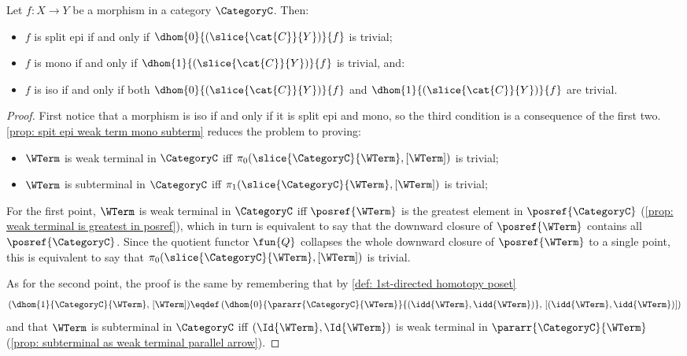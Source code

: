     \begingroup
    \def\thecorollary{\ref{cor: spit epi iff dhom0 trivial mono iff dhom1 trivial}}
    \begin{corollary}
        Let $f\colon X \to Y$ be a morphism in a category $\CategoryC$. Then:
        \begin{itemize}
            \item $f$ is split epi if and only if $\dhom{0}{(\slice{\cat{C}}{Y})}{f}$ is trivial;
            \item $f$ is mono if and only if $\dhom{1}{(\slice{\cat{C}}{Y})}{f}$ is trivial, and:
            \item $f$ is iso if and only if both $\dhom{0}{(\slice{\cat{C}}{Y})}{f}$ and $\dhom{1}{(\slice{\cat{C}}{Y})}{f}$ are trivial.
        \end{itemize}
    \end{corollary}
    \addtocounter{corollary}{-1}
    \endgroup
    \begin{proof}
        First notice that a morphism is iso if and only if it is split epi and mono, so the third condition is a consequence of the first two. \autoref{prop: spit epi weak term mono subterm} reduces the problem to proving:
        \begin{itemize}
            \item $\WTerm$ is weak terminal in $\CategoryC$ iff $\pi_0(\slice{\CategoryC}{\WTerm}, [\WTerm])$ is trivial;
            \item $\WTerm$ is subterminal in $\CategoryC$ iff $\pi_1(\slice{\CategoryC}{\WTerm}, [\WTerm])$ is trivial;
        \end{itemize}
        For the first point, $\WTerm$ is weak terminal in $\CategoryC$ iff $\posref{\WTerm}$ is the greatest element in $\posref{\CategoryC}$ (\autoref{prop: weak terminal is greatest in posref}), which in turn is equivalent to say that the downward closure of $\posref{\WTerm}$ contains all $\posref{\CategoryC}$. Since the quotient functor $\fun{Q}$ collapses the whole downward closure of $\posref{\WTerm}$ to a single point, this is equivalent to say that $\pi_0(\slice{\CategoryC}{\WTerm}, [\WTerm])$ is trivial.

        As for the second point, the proof is the same by remembering that by \autoref{def: 1st-directed homotopy poset}
        \begin{equation*}
            (\dhom{1}{\CategoryC}{\WTerm}, \, [\WTerm]) \eqdef \left(\dhom{0}{\pararr{\CategoryC}{\WTerm}}{(\idd{\WTerm}, \idd{\WTerm})}, \, [(\idd{\WTerm}, \idd{\WTerm})]\right)
        \end{equation*}
        and that $\WTerm$ is subterminal in $\CategoryC$ iff $(\Id{\WTerm}, \Id{\WTerm})$ is weak terminal in $\pararr{\CategoryC}{\WTerm}$ (\autoref{prop: subterminal as weak terminal parallel arrow}).
    \end{proof}


